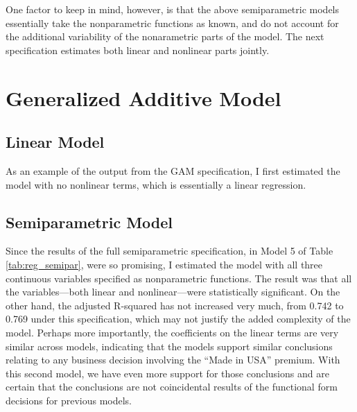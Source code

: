 One factor to keep in mind, however,
is that the above semiparametric models
essentially take the nonparametric functions as known, 
and do not account for the additional variability of
the nonarametric parts of the model.
The next specification estimates both linear 
and nonlinear parts jointly. 




\pagebreak
\section{Generalized Additive Model}

\subsection{Linear Model}

As an example of the output from the GAM specification, 
I first estimated the model with no nonlinear terms, 
which is essentially a linear regression. 



\pagebreak
\subsection{Semiparametric Model}


Since the results of the full semiparametric specification,
in Model 5 of Table \ref{tab:reg_semipar},
were so promising, 
I estimated the model with all three continuous variables specified as nonparametric functions. 
The result was that 
all the variables---both linear and nonlinear---were 
statistically significant. 
On the other hand, 
the adjusted R-squared has not increased very much, 
from 0.742 to 0.769 under this specification, 
which may not justify the added complexity of the model.
Perhaps more importantly, the coefficients on the 
linear terms are very similar across models, 
indicating that the models support similar conclusions relating to any business decision involving
the ``Made in USA'' premium. 
With this second model, we have even more support for those conclusions
and are certain that the conclusions are not 
coincidental results of the
functional form decisions for previous models.


 

% 
